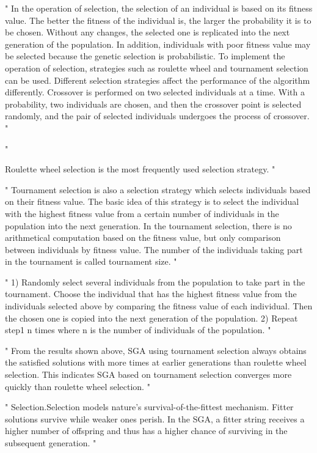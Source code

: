 "
In the operation of selection, the selection of an individual is based on its fitness value. The better the fitness of the individual is, the larger the probability it is to be chosen. Without any changes, the selected one is replicated into the next generation of the population. In addition, individuals with poor fitness value may be selected because the genetic selection is probabilistic. To implement the operation of selection, strategies such as roulette wheel and tournament selection can be used. Different selection strategies affect the performance of the algorithm differently. Crossover is performed on two selected individuals at a time. With a probability, two individuals are chosen, and then the crossover point is selected randomly, and the pair of selected individuals undergoes the process of crossover.
"\cite{jinghui_zhong_comparison_2005}

"

Roulette wheel selection is the most frequently used selection strategy.
"\cite{jinghui_zhong_comparison_2005}


"
Tournament selection is also a selection strategy which selects individuals based on their fitness value. The basic idea of this strategy is to select the individual with the highest fitness value from a certain number of individuals in the population into the next generation. In the tournament selection, there is no arithmetical computation based on the fitness value, but only comparison between individuals by fitness value. The number of the individuals taking part in the tournament is called tournament size.
"\cite{jinghui_zhong_comparison_2005}

"
1) Randomly select several individuals from the population to take part in the tournament. Choose the individual that has the highest fitness value from the individuals selected above by comparing the fitness value of each individual. Then the chosen one is copied into the next generation of the population. 2) Repeat step1 n times where n is the number of individuals of the population.
"\cite{jinghui_zhong_comparison_2005}

"
From the results shown above, SGA using tournament selection always obtains the satisfied solutions with more times at earlier generations than roulette wheel selection. This indicates SGA based on tournament selection converges more quickly than roulette wheel selection.
"\cite{jinghui_zhong_comparison_2005}

"
Selection.Selection models nature's survival-of-the-fittest mechanism. Fitter solutions survive while weaker ones perish. In the SGA, a fitter string receives a higher number of offspring and thus has a higher chance of surviving in the subsequent generation.
"\cite{srinivas_genetic_1994}

